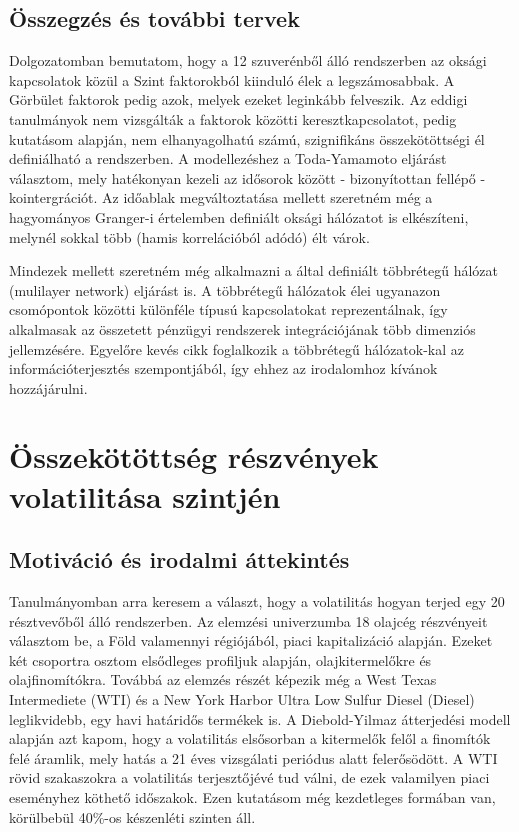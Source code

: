 \documentclass[12pt,bibliography=totoc]{article}
\begin{document}
\subsection{Összegzés és további tervek}
Dolgozatomban bemutatom, hogy a 12 szuverénből álló rendszerben az oksági kapcsolatok közül a Szint faktorokból kiinduló élek a legszámosabbak. A Görbület faktorok pedig azok, melyek ezeket leginkább felveszik. Az eddigi tanulmányok nem vizsgálták a faktorok közötti keresztkapcsolatot, pedig kutatásom alapján, nem elhanyagolhatú számú, szignifikáns összekötöttségi él definiálható a rendszerben. A modellezéshez a Toda-Yamamoto eljárást választom, mely hatékonyan kezeli az idősorok között - bizonyítottan fellépő - kointergrációt. Az időablak megváltoztatása mellett szeretném még a hagyományos Granger-i értelemben definiált oksági hálózatot is elkészíteni, melynél sokkal több (hamis korrelációból adódó) élt várok. 

Mindezek mellett szeretném még alkalmazni a \cite{wang2020multilayer} által definiált többrétegű hálózat (mulilayer network) eljárást is. A többrétegű hálózatok élei ugyanazon csomópontok közötti különféle típusú kapcsolatokat reprezentálnak, így alkalmasak az összetett pénzügyi rendszerek integrációjának több dimenziós jellemzésére. Egyelőre kevés cikk foglalkozik a többrétegű hálózatok-kal az információterjesztés szempontjából, így ehhez az irodalomhoz kívánok hozzájárulni.



\newpage 

\section{Összekötöttség részvények volatilitása szintjén}


\subsection{Motiváció és irodalmi áttekintés}
Tanulmányomban arra keresem a választ, hogy a volatilitás hogyan terjed egy 20 résztvevőből álló rendszerben. Az elemzési univerzumba 18 olajcég részvényeit választom be, a Föld valamennyi régiójából, piaci kapitalizáció alapján. Ezeket két csoportra osztom elsődleges profiljuk alapján, olajkitermelőkre és olajfinomítókra. Továbbá az elemzés részét képezik még a West Texas Intermediete (WTI) és a New York Harbor Ultra Low Sulfur Diesel (Diesel) leglikvidebb, egy havi határidős termékek is. A Diebold-Yilmaz átterjedési modell alapján azt kapom, hogy a volatilitás elsősorban a kitermelők felől a finomítók felé áramlik, mely hatás a 21 éves vizsgálati periódus alatt felerősödött. A WTI rövid szakaszokra a volatilitás terjesztőjévé tud válni, de ezek valamilyen piaci eseményhez köthető időszakok. Ezen kutatásom még kezdetleges formában van, körülbebül 40\%-os készenléti szinten áll. 
\end{document}
